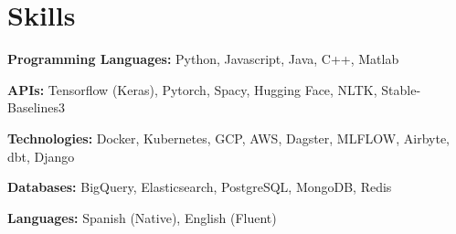 \documentclass{ExpressiveResume}
\begin{document}
\section{Skills}

 {\bf Programming Languages:} Python, Javascript, Java, C++, Matlab

    {\bf APIs:} Tensorflow (Keras), Pytorch, Spacy, Hugging Face, NLTK, Stable-Baselines3

{\bf Technologies:} Docker, Kubernetes, GCP, AWS, Dagster, MLFLOW,
Airbyte, dbt, Django

    {\bf Databases:} BigQuery, Elasticsearch, PostgreSQL, MongoDB, Redis

    {\bf Languages:} Spanish (Native), English (Fluent)
\end{document}
